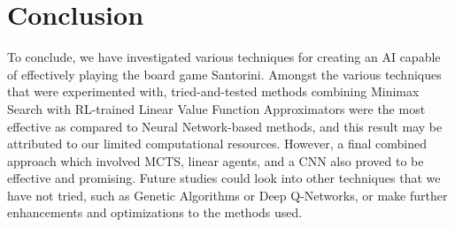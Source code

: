 \documentclass[a4paper,12pt,table]{article}
\begin{document}
\section{Conclusion}
To conclude, we have investigated various techniques for creating an AI capable of effectively playing the board game Santorini. Amongst the various techniques that were experimented with, tried-and-tested methods combining Minimax Search with RL-trained Linear Value Function Approximators were the most effective as compared to Neural Network-based methods, and this result may be attributed to our limited computational resources. However, a final combined approach which involved MCTS, linear agents, and a CNN also proved to be effective and promising. Future studies could look into other techniques that we have not tried, such as Genetic Algorithms or Deep Q-Networks, or make further enhancements and optimizations to the methods used.
\end{document}
